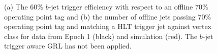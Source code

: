 \begin{figure}[!ht]
\begin{center}
    \end{center}
  \caption{(a) The 60\% $b$-jet trigger efficiency with respect to an offline 70\% operating point tag
    and  (b) the number of offline jets passing 70\% operating point tag and matching a HLT trigger jet
    against vertex class for data from Epoch 1 (black) and simulation (red). 
    The $b$-jet trigger aware GRL has not been applied.}
    \label{fig:Epoch1_vtxClass}
\end{figure}

\FloatBarrier



